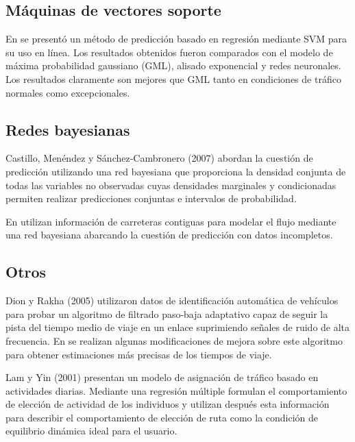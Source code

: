\documentclass{llncs}
\begin{document}
\subsection{Máquinas de vectores soporte}

En \cite{castro2009online} se presentó un método de predicción basado en regresión mediante SVM para su uso en línea. Los resultados obtenidos fueron comparados con el modelo de máxima probabilidad gaussiano (GML), alisado exponencial y redes neuronales. Los resultados claramente son mejores que GML tanto en condiciones de tráfico normales como excepcionales.



\subsection{Redes bayesianas}
Castillo, Menéndez y Sánchez-Cambronero (2007) \cite{castillo2008predicting} abordan la cuestión de predicción utilizando una red bayesiana que proporciona la densidad conjunta de todas las variables no observadas cuyas densidades marginales y condicionadas permiten realizar predicciones conjuntas e intervalos de probabilidad.

En \cite{sun2006bayesian} utilizan información de carreteras contiguas para modelar el flujo mediante una red bayesiana abarcando la cuestión de predicción con datos incompletos.


\subsection{Otros}

Dion y Rakha (2005) \cite{dion2006estimating} utilizaron datos de identificación automática de vehículos para probar un algoritmo de filtrado paso-baja adaptativo capaz de seguir la pista del tiempo medio de viaje en un enlace suprimiendo señales de ruido de alta frecuencia.
En \cite{tam2008using} se realizan algunas modificaciones de mejora sobre este algoritmo para obtener estimaciones más precisas de los tiempos de viaje.

Lam y Yin (2001) \cite{lam2001activity} presentan un modelo de asignación de tráfico basado en actividades diarias. Mediante una regresión múltiple formulan el comportamiento de elección de actividad de los individuos y utilizan después esta información para describir el comportamiento de elección de ruta como la condición de equilibrio dinámica ideal para el usuario.






\end{document}
